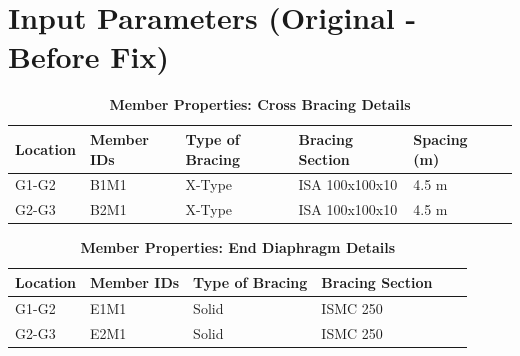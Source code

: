 \documentclass[12pt,a4paper]{report}
\begin{document}
\chapter{Input Parameters (Original - Before Fix)}

\setlength\LTleft{0pt}
\setlength\LTright{\fill}

\begin{longtable}{|L{2.2cm}|L{2.2cm}|L{3.0cm}|L{2.5cm}|C{1.8cm}|C{1.8cm}|}
\caption{\textbf{Member Properties: Cross Bracing Details}}
\hline
\textbf{Location} & \textbf{Member IDs} & \textbf{Type of Bracing} & \textbf{Bracing Section} & \textbf{Spacing (m)} \\
\hline
G1-G2 & B1M1 & X-Type & ISA 100x100x10 & 4.5 m \\[6pt]
\hline
G2-G3 & B2M1 & X-Type & ISA 100x100x10 & 4.5 m \\[6pt]
\hline
\end{longtable}

\vspace{0.8em}
\setlength\LTleft{0pt}
\setlength\LTright{\fill}

\begin{longtable}{|L{2.2cm}|L{2.2cm}|L{3.0cm}|L{2.5cm}|C{1.8cm}|C{1.8cm}|}
\caption{\textbf{Member Properties: End Diaphragm Details}}
\hline
\textbf{Location} & \textbf{Member IDs} & \textbf{Type of Bracing} & \textbf{Bracing Section} \\
\hline
G1-G2 & E1M1 & Solid & ISMC 250 \\[6pt]
\hline
G2-G3 & E2M1 & Solid & ISMC 250 \\[6pt]
\hline
\end{longtable}
\end{document}
